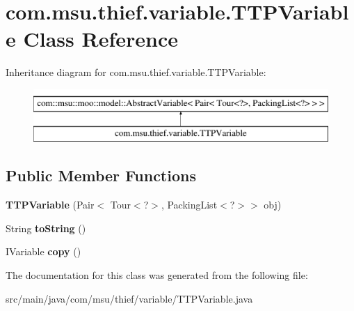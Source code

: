 \hypertarget{classcom_1_1msu_1_1thief_1_1variable_1_1TTPVariable}{\section{com.\-msu.\-thief.\-variable.\-T\-T\-P\-Variable Class Reference}
\label{classcom_1_1msu_1_1thief_1_1variable_1_1TTPVariable}
}
Inheritance diagram for com.\-msu.\-thief.\-variable.\-T\-T\-P\-Variable\-:\begin{figure}[H]
\begin{center}
\leavevmode
\includegraphics[height=2.000000cm]{classcom_1_1msu_1_1thief_1_1variable_1_1TTPVariable}
\end{center}
\end{figure}
\subsection*{Public Member Functions}
\begin{DoxyCompactItemize}
\item 
\hypertarget{classcom_1_1msu_1_1thief_1_1variable_1_1TTPVariable_a3c8e564e6b9cf68a6cfb31de312634b7}{{\bfseries T\-T\-P\-Variable} (Pair$<$ Tour$<$?$>$, Packing\-List$<$?$>$$>$ obj)}\label{classcom_1_1msu_1_1thief_1_1variable_1_1TTPVariable_a3c8e564e6b9cf68a6cfb31de312634b7}

\item 
\hypertarget{classcom_1_1msu_1_1thief_1_1variable_1_1TTPVariable_a0e76b83c7d46c269bed8e31f783c62ec}{String {\bfseries to\-String} ()}\label{classcom_1_1msu_1_1thief_1_1variable_1_1TTPVariable_a0e76b83c7d46c269bed8e31f783c62ec}

\item 
\hypertarget{classcom_1_1msu_1_1thief_1_1variable_1_1TTPVariable_a3763b6b0d91613fae9be56262c0b78dc}{I\-Variable {\bfseries copy} ()}\label{classcom_1_1msu_1_1thief_1_1variable_1_1TTPVariable_a3763b6b0d91613fae9be56262c0b78dc}

\end{DoxyCompactItemize}


The documentation for this class was generated from the following file\-:\begin{DoxyCompactItemize}
\item 
src/main/java/com/msu/thief/variable/T\-T\-P\-Variable.\-java\end{DoxyCompactItemize}
